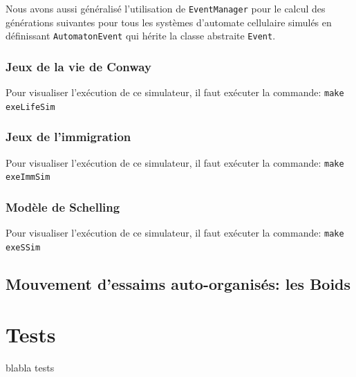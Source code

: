 \documentclass [a4paper,11pt,titlepage] {article}
\begin{document}
Nous avons aussi généralisé l'utilisation de \texttt{EventManager} pour le calcul des générations suivantes pour tous les systèmes d'automate cellulaire simulés en définissant \texttt{AutomatonEvent} qui hérite la classe abstraite \texttt{Event}.

\subsubsection {Jeux de la vie de Conway}
Pour visualiser l'exécution de ce simulateur, il faut exécuter la commande: \texttt{make exeLifeSim}

\subsubsection {Jeux de l'immigration}
Pour visualiser l'exécution de ce simulateur, il faut exécuter la commande: \texttt{make exeImmSim}

\subsubsection {Modèle de Schelling}
Pour visualiser l'exécution de ce simulateur, il faut exécuter la commande: \texttt{make exeSSim}
\subsection{Mouvement d’essaims auto-organisés: les Boids}

\section {Tests}

blabla tests
\end{document}
